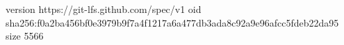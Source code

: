 version https://git-lfs.github.com/spec/v1
oid sha256:f0a2ba456bf0e3979b9f7a4f1217a6a477db3ada8c92a9e96afcc5fdeb22da95
size 5566
